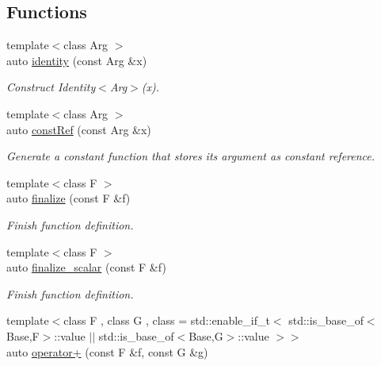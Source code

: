 \subsection*{Functions}
\begin{DoxyCompactItemize}
\item 
\hypertarget{namespaceRFFGen_af20942553f30cb8b3a7dc84b9581aeb3}{{\footnotesize template$<$class Arg $>$ }\\auto \hyperlink{namespaceRFFGen_af20942553f30cb8b3a7dc84b9581aeb3}{identity} (const Arg \&x)}\label{namespaceRFFGen_af20942553f30cb8b3a7dc84b9581aeb3}

\begin{DoxyCompactList}\small\item\em Construct Identity$<$\-Arg$>$(x). \end{DoxyCompactList}\item 
{\footnotesize template$<$class Arg $>$ }\\auto \hyperlink{namespaceRFFGen_a1e5703444079774f6e6a9161a9bacc6b}{const\-Ref} (const Arg \&x)
\begin{DoxyCompactList}\small\item\em Generate a constant function that stores its argument as constant reference. \end{DoxyCompactList}\item 
{\footnotesize template$<$class F $>$ }\\auto \hyperlink{namespaceRFFGen_ad0d4bfae5fedad4740c0ab09cb4ff0a1}{finalize} (const F \&f)
\begin{DoxyCompactList}\small\item\em Finish function definition. \end{DoxyCompactList}\item 
{\footnotesize template$<$class F $>$ }\\auto \hyperlink{namespaceRFFGen_a8a6f6d638cd22c164c671c239486bb88}{finalize\-\_\-scalar} (const F \&f)
\begin{DoxyCompactList}\small\item\em Finish function definition. \end{DoxyCompactList}\item 
{\footnotesize template$<$class F , class G , class  = std\-::enable\-\_\-if\-\_\-t$<$ std\-::is\-\_\-base\-\_\-of$<$\-Base,\-F$>$\-::value $\vert$$\vert$                                      std\-::is\-\_\-base\-\_\-of$<$\-Base,\-G$>$\-::value $>$$>$ }\\auto \hyperlink{namespaceRFFGen_a45fcf65f6c783e3da0a0007291f706ca}{operator+} (const F \&f, const G \&g)

\end{DoxyCompactItemize}
